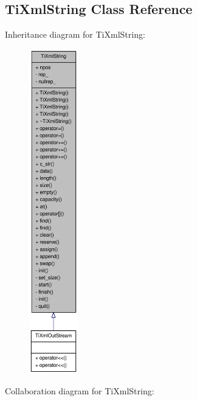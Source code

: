\hypertarget{class_ti_xml_string}{
\subsection{TiXmlString Class Reference}
\label{class_ti_xml_string}
}
Inheritance diagram for TiXmlString:\nopagebreak
\begin{figure}[H]
\begin{center}
\leavevmode
\includegraphics[height=400pt]{class_ti_xml_string__inherit__graph}
\end{center}
\end{figure}
Collaboration diagram for TiXmlString:\nopagebreak
